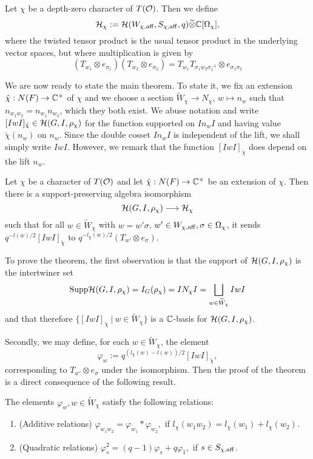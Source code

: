     \begin{definition}
        Let $\chi$ be a depth-zero character of $T(\mathcal{O})$. Then we define 
        $$\mathcal{H}_\chi:=\mathcal{H}(W_{\chi,\mathrm{aff}},S_{\chi,\mathrm{aff}},q)\widetilde\otimes\mathbb{C}[\Omega_\chi],$$ 
        where the twisted tensor product is the usual tensor product in the underlying vector spaces, but where multiplication is given by 
        $$(T_{w_1}\otimes e_{\sigma_1})(T_{w_2}\otimes e_{\sigma_2})=T_{w_1}T_{\sigma_1w_2\sigma_1^{-1}}\otimes e_{\sigma_1\sigma_2}$$
    \end{definition}
    We are now ready to state the main theorem. To state it, we fix an extension $\check{\chi}:N(F)\rightarrow\mathbb{C}^\times$ of $\chi$ and we choose a section $\widetilde{W}_\chi\rightarrow N_\chi$, $w\mapsto n_w$ such that $n_{w_1w_2}=n_{w_1}n_{w_2}$, which they both exist. We abuse notation and write $[IwI]_{\check{\chi}}\in\mathcal{H}(G,I,\rho_\chi)$ for the function supported on $In_wI$ and having value $\check{\chi}(n_w)$ on $n_w$. Since the double cosset $In_wI$ is independent of the lift, we shall simply write $IwI$. However, we remark that the function $[IwI]_{\check{\chi}}$ does depend on the lift $n_w$.
    \begin{theorem}
        Let $\chi$ be a character of $T(\mathcal{O})$ and let $\check{\chi}:N(F)\rightarrow\mathbb{C}^\times$ be an extension of $\chi$. Then there is a support-preserving algebra isomorphism 
        $$\mathcal{H}(G,I,\rho_\chi)\longrightarrow\mathcal{H}_\chi$$
        such that for all $w\in \widetilde{W}_\chi$ with $w=w'\sigma$, $w'\in W_{\chi,\mathrm{aff}}, \sigma\in\Omega_\chi$,
        it sends $q^{-l(w)/2}[IwI]_{\check{\chi}}$ to $q^{-l_\chi(w)/2}(T_{w'}\otimes e_\sigma)$.
    \end{theorem}

    To prove the theorem, the first observation is that the support of $\mathcal{H}(G,I,\rho_\chi)$ is the intertwiner set $$\mathrm{Supp}\mathcal{H}(G,I,\rho_\chi)=I_G(\rho_\chi)=IN_\chi I=\bigsqcup_{w\in\widetilde{W}_\chi}IwI$$ and that therefore $\{[IwI]_{\check{\chi}}\ |\ w\in\widetilde{W}_\chi\}$ is a $\mathbb{C}$-basis for $\mathcal{H}(G,I,\rho_\chi)$.

    Secondly, we may define, for each $w\in\widetilde{W}_\chi$, the element
    $$\varphi_w:=q^{(l_\chi(w)-l(w))/2}[IwI]_{\check{\chi}},$$
    corresponding to $T_{w'}\otimes e_\sigma$ under the isomorphism. Then the proof of the theorem is a direct consequence of the following result.

    \begin{proposition}
        The elements $\varphi_w, w\in\widetilde{W}_\chi$ satisfy the following relations:
        \begin{enumerate}
            \item (Additive relations) $\varphi_{w_1w_2}=\varphi_{w_1}*\varphi_{w_2},$ if $l_\chi(w_1w_2)=l_\chi(w_1)+l_\chi(w_2)$.
            \item (Quadratic relations) $\varphi_s^2=(q-1)\varphi_s+q\varphi_1,$ if $s\in S_{\chi,\mathrm{aff}}$. 
        \end{enumerate} 
    \end{proposition}
    